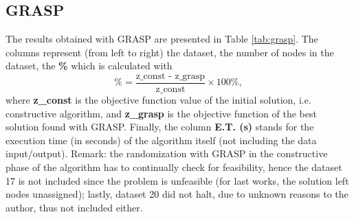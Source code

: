 \documentclass[10pt,twoside]{article}
\begin{document}
\subsection{GRASP}
The results obtained with GRASP are presented in Table \ref{tab:grasp}. The columns represent (from left to right) the dataset, the number of nodes in the dataset, the \textbf{\%} which is calculated with 
\begin{equation}\label{eq:perc}
    \%=\dfrac{\text{z\_const - z\_grasp}}{\text{z\_const}}\times100\%,
\end{equation}
where \textbf{z\_const} is the objective function value of the initial solution, i.e. constructive algorithm, and \textbf{z\_grasp} is the objective function of the best solution found with GRASP. Finally, the column \textbf{E.T. (s)} stands for the execution time (in seconds) of the algorithm itself (not including the data input/output). Remark: the randomization with GRASP in the constructive phase of the algorithm has to continually check for feasibility, hence the dataset 17 is not included since the problem is unfeasible (for last works, the solution left nodes unassigned); lastly, dataset 20 did not halt, due to unknown reasons to the author, thus not included either.
\end{document}
